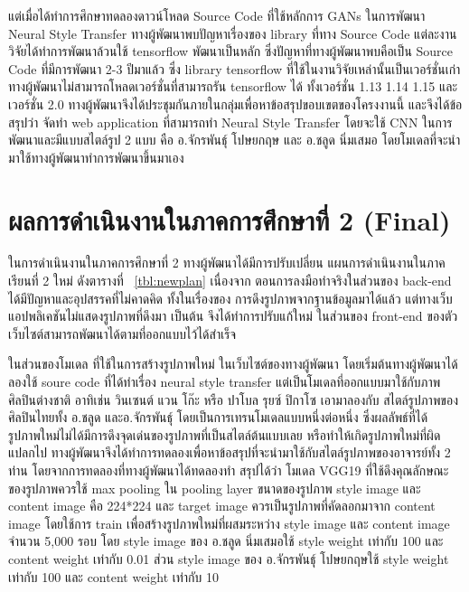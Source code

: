 \documentclass[12pt,oneside,openright,a4paper]{cpe-thai-project}
\begin{document}
\par\setlength{\parindent}{5ex}
แต่เมื่อได้ทำการศึกษาทดลองดาวน์โหลด Source Code ที่ใช้หลักการ GANs ในการพัฒนา Neural Style Transfer ทางผู้พัฒนาพบปัญหาเรื่องของ library ที่ทาง Source  Code แต่ละงานวิจัยได้ทำการพัฒนาล้วนใช้ tensorflow พัฒนาเป็นหลัก ซึ่งปัญหาที่ทางผู้พัฒนาพบคือเป็น Source Code ที่มีการพัฒนา 2-3 ปีมาแล้ว ซึ่ง library tensorflow ที่ใช้ในงานวิจัยเหล่านั้นเป็นเวอร์ชั่นเก่า ทางผู้พัฒนาไม่สามารถโหลดเวอร์ชั่นที่สามารถรัน tensorflow ได้ ทั้งเวอร์ชั่น 1.13 1.14 1.15 และเวอร์ชั่น 2.0 ทางผู้พัฒนาจึงได้ประชุมกันภายในกลุ่มเพื่อหาข้อสรุปขอบเขตของโครงงานนี้ และจึงได้ข้อสรุปว่า จัดทำ web application ที่สามารถทำ Neural Style Transfer โดยจะใช้ CNN ในการพัฒนาและมีแบบสไตล์รูป 2 แบบ คือ อ.จักรพันธุ์ โปษยกฤษ และ อ.ชลูด นิ่มเสมอ โดยโมเดลที่จะนำมาใช้ทางผู้พัฒนาทำการพัฒนาขึ้นมาเอง

\section{ผลการดำเนินงานในภาคการศึกษาที่ 2 (Final) }
\par\setlength{\parindent}{5ex}
ในการดำเนินงานในภาคการศึกษาที่ 2 ทางผู้พัฒนาได้มีการปรับเปลี่ยน แผนการดำเนินงานในภาคเรียนที่ 2 ใหม่ ดังตารางที่ ~\ref{tbl:newplan} เนื่องจาก ตอนการลงมือทำจริงในส่วนของ back-end ได้มีปัญหาและอุปสรรคที่ไม่คาดคิด ทั้งในเรื่องของ การดึงรูปภาพจากฐานข้อมูลมาได้แล้ว แต่ทางเว็บแอปพลิเคชันไม่แสดงรูปภาพที่ดึงมา เป็นต้น   จึงได้ทำการปรับแก้ใหม่ ในส่วนของ front-end ของตัวเว็บไซต์สามารถพัฒนาได้ตามที่ออกแบบไว้ได้สำเร็จ 
\par\setlength{\parindent}{5ex}
ในส่วนของโมเดล ที่ใช้ในการสร้างรูปภาพใหม่ ในเว็บไซต์ของทางผู้พัฒนา  โดยเริ่มต้นทางผู้พัฒนาได้ลองใช้ soure code ที่ได้ทำเรื่อง neural style transfer แต่เป็นโมเดลที่ออกแบบมาใช้กับภาพศิลปินต่างชาติ อาทิเช่น วินเซนต์ แวน โก๊ะ หรือ ปาโบล รุยซ์ ปิกาโซ เอามาลองกับ สไตล์รูปภาพของศิลปินไทยทั้ง อ.ชลูด และอ.จักรพันธุ์ โดยเป็นการเทรนโมเดลแบบหนึ่งต่อหนึ่ง ซึ่งผลลัพธ์ที่ได้ รูปภาพใหม่ไม่ได้มีการดึงจุดเด่นของรูปภาพที่เป็นสไตล์ต้นแบบเลย หรือทำให้เกิดรูปภาพใหม่ที่ผิดแปลกไป ทางผู้พัฒนาจึงได้ทำการทดลองเพื่อหาข้อสรุปที่จะนำมาใช้กับสไตล์รูปภาพของอาจารย์ทั้ง 2 ท่าน โดยจากการทดลองที่ทางผู้พัฒนาได้ทดลองทำ สรุปได้ว่า โมเดล VGG19 ที่ใช้ดึงคุณลักษณะของรูปภาพควรใช้ max pooling ใน pooling layer ขนาดของรูปภาพ style image และ content image คือ 224*224 และ target image ควรเป็นรูปภาพที่คัดลอกมาจาก content image โดยใช้การ train เพื่อสร้างรูปภาพใหม่ที่ผสมระหว่าง style image และ content image จำนวน 5,000 รอบ โดย style image ของ อ.ชลูด นิ่มเสมอใช้ style weight เท่ากับ 100 และ content weight เท่ากับ 0.01 ส่วน style image ของ อ.จักรพันธุ์ โปษยกฤษใช้  style weight เท่ากับ 100 และ content weight เท่ากับ 10
\end{document}
